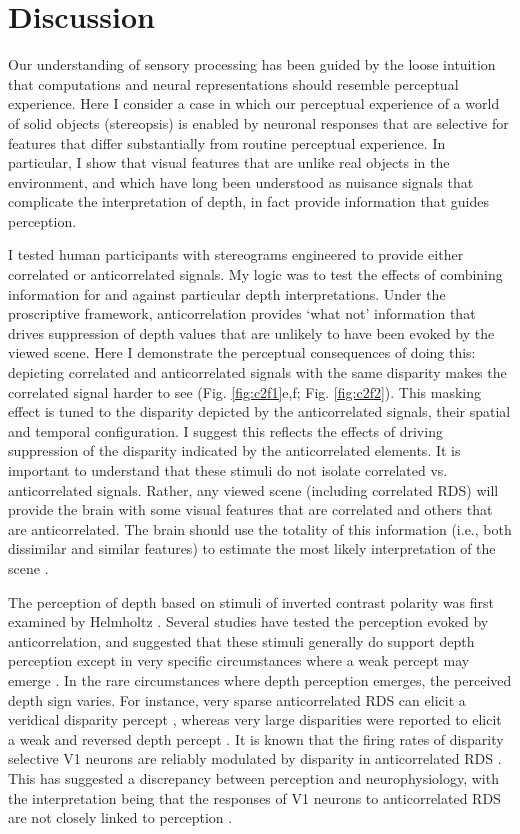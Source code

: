 \section{Discussion}
Our understanding of sensory processing has been guided by the loose intuition that computations and neural representations should resemble perceptual experience. Here I consider a case in which our perceptual experience of a world of solid objects (stereopsis) is enabled by neuronal responses that are selective for features that differ substantially from routine perceptual experience. In particular, I show that visual features that are unlike real objects in the environment, and which have long been understood as nuisance signals that complicate the interpretation of depth, in fact provide information that guides perception. 

I tested human participants with stereograms engineered to provide either correlated or anticorrelated signals. My logic was to test the effects of combining information for and against particular depth interpretations. Under the proscriptive framework, anticorrelation provides `what not' information that drives suppression of depth values that are unlikely to have been evoked by the viewed scene. Here I demonstrate the perceptual consequences of doing this: depicting correlated and anticorrelated signals with the same disparity makes the correlated signal harder to see (Fig. \ref{fig:c2f1}e,f; Fig. \ref{fig:c2f2}). This masking effect is tuned to the disparity depicted by the anticorrelated signals, their spatial and temporal configuration. I suggest this reflects the effects of driving suppression of the disparity indicated by the anticorrelated elements. It is important to understand that these stimuli do not isolate correlated vs. anticorrelated signals. Rather, any viewed scene (including correlated RDS) will provide the brain with some visual features that are correlated and others that are anticorrelated. The brain should use the totality of this information (i.e., both dissimilar and similar features) to estimate the most likely interpretation of the scene \cite{Goncalves:2017aa}. 

The perception of depth based on stimuli of inverted contrast polarity was first examined by Helmholtz \cite{helmholtz1909physiological}. Several studies have tested the perception evoked by anticorrelation, and suggested that these stimuli generally do support depth perception \cite{BLTJ:BLTJ3954} except in very specific circumstances where a weak percept may emerge \cite{JULESZ:1964ff,Cogan:1993yr,Cumming:1998ib,Read:2000kx,Hibbard2014}. In the rare circumstances where depth perception emerges, the perceived depth sign varies. For instance, very sparse anticorrelated RDS can elicit a veridical disparity percept \cite{Cogan:1993yr,Cumming:1998ib}, whereas very large disparities were reported to elicit a weak and reversed depth percept \cite{Doi:2011ku}. It is known that the firing rates of disparity selective V1 neurons are reliably modulated by disparity in anticorrelated RDS \cite{Cumming:1997ve,Samonds:2013cs}. This has suggested a discrepancy between perception and neurophysiology, with the interpretation being that the responses of V1 neurons to anticorrelated RDS are not closely linked to perception \cite{Cumming:1998ib}.

